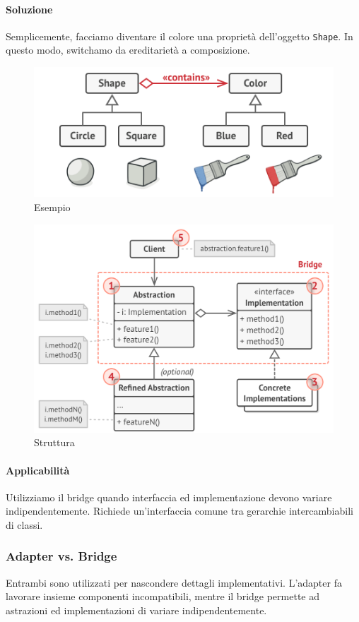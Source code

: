 \documentclass[11pt]{article}
\newcommand{\code}[1]{\texttt{#1}}
\begin{document}
\paragraph{Soluzione}
Semplicemente, facciamo diventare il colore una proprietà dell'oggetto \code{Shape}. In questo modo, switchamo da ereditarietà a composizione. 
\begin{figure}[H]
    \centering
    \includegraphics[width=\linewidth]{res/teoria/Bridge.png}
    \caption{Esempio}
\end{figure}
\begin{figure}[H]
    \centering
    \includegraphics[width=\linewidth]{res/teoria/BridgeStructure.png}
    \caption{Struttura}
\end{figure}
\paragraph{Applicabilità}
Utilizziamo il bridge quando interfaccia ed implementazione devono variare indipendentemente. Richiede un'interfaccia comune tra gerarchie intercambiabili di classi. 
\subsubsection{Adapter vs. Bridge}
Entrambi sono utilizzati per nascondere dettagli implementativi. L'adapter fa lavorare insieme componenti incompatibili, mentre il bridge permette ad astrazioni ed implementazioni di variare indipendentemente.
\end{document}

